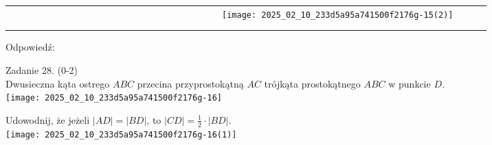 \documentclass[10pt]{article}
\begin{document}
\begin{center}
\begin{tabular}{|c|c|c|c|c|c|c|c|c|c|c|c|c|c|c|c|c|c|c|c|c|c|c|c|c|c|}
\hline
 &  &  &  &  &  &  &  &  &  &  &  &  &  &  &  &  &  &  &  &  &  &  &  &  &  \\
\hline
 &  &  &  &  &  &  &  &  &  &  &  &  &  &  &  &  &  &  &  &  &  & \texttt{[image: 2025\_02\_10\_233d5a95a741500f2176g-15(2)]}
 &  &  &  \\
\hline
 &  &  &  &  &  &  &  &  &  &  &  &  &  &  &  &  &  &  &  &  &  &  &  &  &  \\
\hline
 &  &  &  &  &  &  &  &  &  &  &  &  &  &  &  &  &  &  &  &  &  &  &  &  &  \\
\hline
\end{tabular}
\end{center}

Odpowiedź:

Zadanie 28. (0-2)\\
Dwusieczna kąta ostrego \(A B C\) przecina przyprostokątną \(A C\) trójkąta prostokątnego \(A B C\) w punkcie \(D\).\\
\texttt{[image: 2025\_02\_10\_233d5a95a741500f2176g-16]}

Udowodnij, że jeżeli \(|A D|=|B D|\), to \(|C D|=\frac{1}{2} \cdot|B D|\).\\
\texttt{[image: 2025\_02\_10\_233d5a95a741500f2176g-16(1)]}
\end{document}
